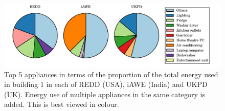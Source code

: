 \documentclass{sig-alternate}
\begin{document}
\begin{figure}
 \centering
 \includegraphics{figures/top_k_appliances_pie.pdf}
 \caption{Top 5 appliances in terms of the proportion of the total
   energy used in building 1 in each of REDD (USA), iAWE (India) and
   UKPD (UK). Energy use of multiple appliances in the same category is added.  This is best viewed in colour.}
 \label{fig:pie}
\end{figure}

%
%
%
\end{document}

